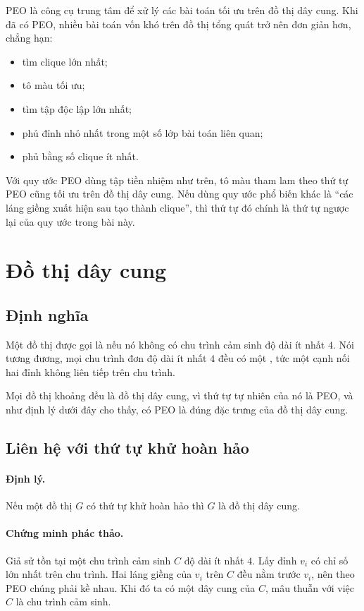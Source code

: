 \documentclass[11pt]{article}
\begin{document}
PEO là công cụ trung tâm để xử lý các bài toán tối ưu trên đồ thị dây cung.
Khi đã có PEO, nhiều bài toán vốn khó trên đồ thị tổng quát trở nên đơn giản
hơn, chẳng hạn:
\begin{itemize}
  \item tìm clique lớn nhất;
  \item tô màu tối ưu;
  \item tìm tập độc lập lớn nhất;
  \item phủ đỉnh nhỏ nhất trong một số lớp bài toán liên quan;
  \item phủ bằng số clique ít nhất.
\end{itemize}

Với quy ước PEO dùng tập tiền nhiệm như trên, tô màu tham lam theo thứ tự PEO
cũng tối ưu trên đồ thị dây cung. Nếu dùng quy ước phổ biến khác là ``các láng
giềng xuất hiện sau tạo thành clique'', thì thứ tự đó chính là thứ tự ngược
lại của quy ước trong bài này.

\section{Đồ thị dây cung}

\subsection{Định nghĩa}

Một đồ thị được gọi là  nếu nó không có chu trình cảm
sinh độ dài ít nhất $4$. Nói tương đương, mọi chu trình đơn độ dài ít nhất $4$
đều có một , tức một cạnh nối hai đỉnh không liên tiếp trên chu
trình.

Mọi đồ thị khoảng đều là đồ thị dây cung, vì thứ tự tự nhiên của nó là PEO, và
như định lý dưới đây cho thấy, có PEO là đúng đặc trưng của đồ thị dây cung.

\subsection{Liên hệ với thứ tự khử hoàn hảo}

\paragraph{Định lý.}
Nếu một đồ thị $G$ có thứ tự khử hoàn hảo thì $G$ là đồ thị dây cung.

\paragraph{Chứng minh phác thảo.}
Giả sử tồn tại một chu trình cảm sinh $C$ độ dài ít nhất $4$. Lấy đỉnh $v_i$
có chỉ số lớn nhất trên chu trình. Hai láng giềng của $v_i$ trên $C$ đều nằm
trước $v_i$, nên theo PEO chúng phải kề nhau. Khi đó ta có một dây cung của
$C$, mâu thuẫn với việc $C$ là chu trình cảm sinh.
\end{document}
